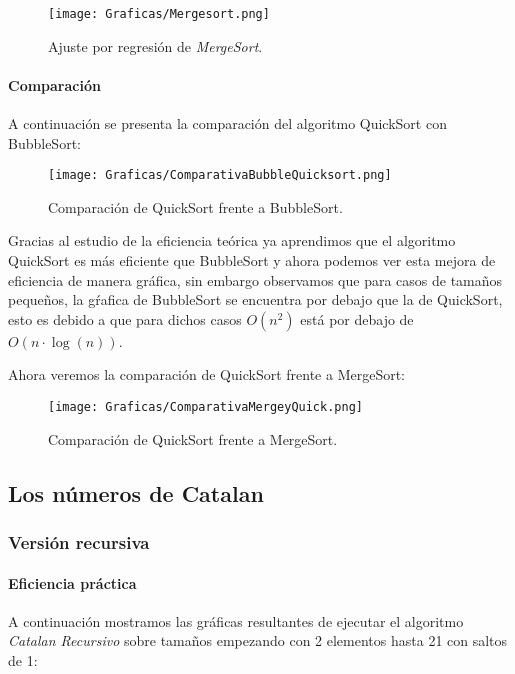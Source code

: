 \documentclass[a4paper,12pt]{article} %
\begin{document}
\begin{figure}[H]
	\centering
	\texttt{[image: Graficas/Mergesort.png]}
	\caption{Ajuste por regresión de \textit{MergeSort}.}
\end{figure}


\paragraph{Comparación}

A continuación se presenta la comparación del algoritmo QuickSort con BubbleSort:

\begin{figure}[H]
	\centering
	\texttt{[image: Graficas/ComparativaBubbleQuicksort.png]}
	\caption{Comparación de QuickSort frente a BubbleSort.}
\end{figure}

Gracias al estudio de la eficiencia teórica ya aprendimos que el algoritmo QuickSort es más eficiente que
BubbleSort y ahora podemos ver esta mejora de eficiencia de manera gráfica, sin embargo observamos que para
casos de tamaños pequeños, la gŕafica de BubbleSort se encuentra por debajo que la de QuickSort, esto es debido
a que para dichos casos $O(n^2)$ está por debajo de $O(n\cdot \log (n))$.

Ahora veremos la comparación de QuickSort frente a MergeSort:

\begin{figure}[H]
	\centering
	\texttt{[image: Graficas/ComparativaMergeyQuick.png]}
	\caption{Comparación de QuickSort frente a MergeSort.}
\end{figure}


\subsection{Los números de Catalan}

\subsubsection{Versión recursiva}

\paragraph{Eficiencia práctica}

A continuación mostramos las gráficas resultantes de ejecutar el algoritmo \textit{Catalan Recursivo}
sobre tamaños empezando con 2 elementos hasta 21 con saltos de 1:
\end{document}
